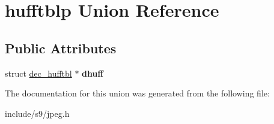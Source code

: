 \hypertarget{unionhufftblp}{\section{hufftblp Union Reference}
\label{unionhufftblp}
}
\subsection*{Public Attributes}
\begin{DoxyCompactItemize}
\item 
\hypertarget{unionhufftblp_a5b28307fa2aee035f813db499a48dfe4}{struct \hyperlink{structdec__hufftbl}{dec\-\_\-hufftbl} $\ast$ {\bfseries dhuff}}\label{unionhufftblp_a5b28307fa2aee035f813db499a48dfe4}

\end{DoxyCompactItemize}


The documentation for this union was generated from the following file\-:\begin{DoxyCompactItemize}
\item 
include/s9/jpeg.\-h\end{DoxyCompactItemize}
